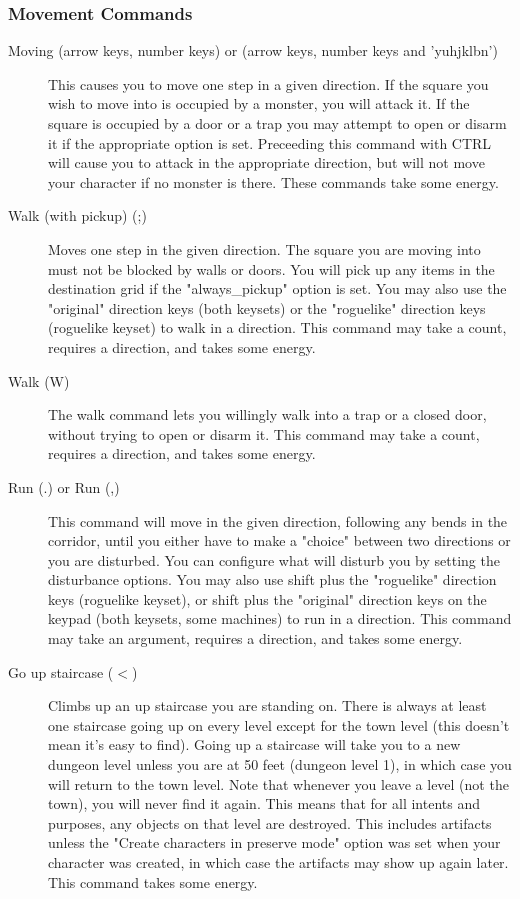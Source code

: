 \subsubsection{Movement Commands}
\begin{description}
\item[Moving (arrow keys, number keys) or (arrow keys, number keys and
  'yuhjklbn')]
  This causes you to move one step in a given direction. If the square you
  wish to move into is occupied by a monster, you will attack it. If the
  square is occupied by a door or a trap you may attempt to open or disarm
  it if the appropriate option is set.  Preceeding this command with CTRL
  will cause you to attack in the appropriate direction, but will not move
  your character if no monster is there. These commands take some energy.

\item[Walk (with pickup) (;)] Moves one step in the
  given direction. The square you are moving into must not be
  blocked by walls or doors. You will pick up any items in the
  destination grid if the "always\_pickup" option is set.  You may
  also use the "original" direction keys (both keysets) or the
  "roguelike" direction keys (roguelike keyset) to walk in a
  direction. This command may take a count, requires a direction,
  and takes some energy.

\item[Walk (W)] The walk command lets you willingly walk into a trap
  or a closed door, without trying to open or disarm it. This
  command may take a count, requires a direction, and takes some
  energy.
  
\item[Run (.) or Run (,)] This command will move in the given
  direction, following any bends in the corridor, until you either
  have to make a "choice" between two directions or you are
  disturbed. You can configure what will disturb you by setting
  the disturbance options. You may also use shift plus the
  "roguelike" direction keys (roguelike keyset), or shift plus the
  "original" direction keys on the keypad (both keysets, some
  machines) to run in a direction. This command may take an
  argument, requires a direction, and takes some energy.
  
\item[Go up staircase ($<$)] Climbs up an up staircase you are
  standing on. There is always at least one staircase going up on
  every level except for the town level (this doesn't mean it's
  easy to find). Going up a staircase will take you to a new
  dungeon level unless you are at 50 feet (dungeon level 1), in
  which case you will return to the town level. Note that whenever
  you leave a level (not the town), you will never find it again.
  This means that for all intents and purposes, any objects on
  that level are destroyed. This includes artifacts unless the
  "Create characters in preserve mode" option was set when your
  character was created, in which case the artifacts may show up
  again later. This command takes some energy.
  

\end{description}
